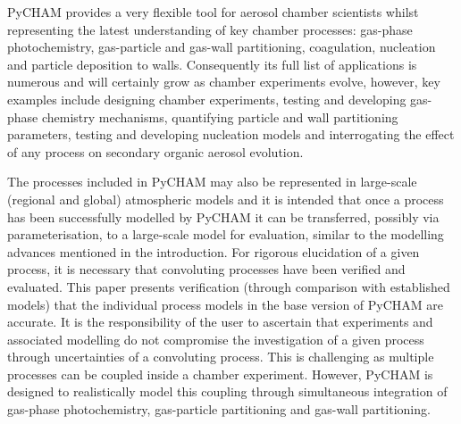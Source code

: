 \documentclass[gmd, manuscript]{copernicus}
\begin{document}
PyCHAM provides a very flexible tool for aerosol chamber scientists whilst representing the latest understanding of key chamber processes: gas-phase photochemistry, gas-particle and gas-wall partitioning, coagulation, nucleation and particle deposition to walls.  Consequently its full list of applications is numerous and will certainly grow as chamber experiments evolve, however, key examples include designing chamber experiments, testing and developing gas-phase chemistry mechanisms, quantifying particle and wall partitioning parameters, testing and developing nucleation models and interrogating the effect of any process on secondary organic aerosol evolution.

The processes included in PyCHAM may also be represented in large-scale (regional and global) atmospheric models and it is intended that once a process has been successfully modelled by PyCHAM it can be transferred, possibly via parameterisation, to a large-scale model for evaluation, similar to the modelling advances mentioned in the introduction.  For rigorous elucidation of a given process, it is necessary that convoluting processes have been verified and evaluated.  This paper presents verification (through comparison with established models) that the individual process models in the base version of PyCHAM are accurate.  It is the responsibility of the user to ascertain that experiments and associated modelling do not compromise the investigation of a given process through uncertainties of a convoluting process.  This is challenging as multiple processes can be coupled inside a chamber experiment.  However, PyCHAM is designed to realistically model this coupling through simultaneous integration of gas-phase photochemistry, gas-particle partitioning and gas-wall partitioning.
\end{document}
